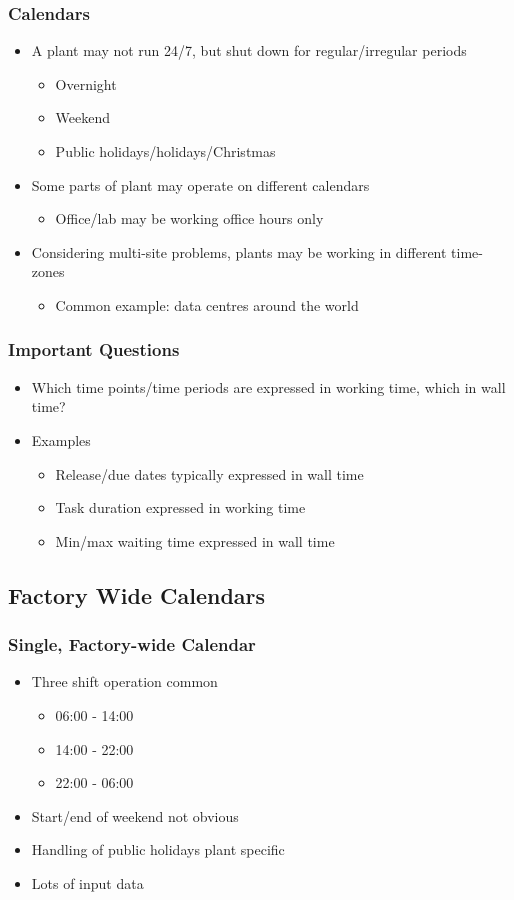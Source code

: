 \begin{frame}
\frametitle{Calendars}
\begin{itemize}
\item A plant may not run 24/7, but shut down for regular/irregular periods
\begin{itemize}
\item Overnight
\item Weekend
\item Public holidays/holidays/Christmas
\end{itemize}
\item Some parts of plant may operate on different calendars
\begin{itemize}
\item Office/lab may be working office hours only
\end{itemize}
\item Considering multi-site problems, plants may be working in different time-zones
\begin{itemize}
\item Common example: data centres around the world
\end{itemize}
\end{itemize}
\end{frame}

\begin{frame}
\frametitle{Important Questions}
\begin{itemize}
\item Which time points/time periods are expressed in working time, which in wall time?
\item Examples
\begin{itemize}
\item Release/due dates typically expressed in wall time
\item Task duration expressed in working time
\item Min/max waiting time expressed in wall time
\end{itemize}

\end{itemize}
\end{frame}

\subsection{Factory Wide Calendars}

\begin{frame}
\frametitle{Single, Factory-wide Calendar}
\begin{itemize}
\item Three shift operation common
\begin{itemize}
\item 06:00 - 14:00
\item 14:00 - 22:00
\item 22:00 - 06:00
\end{itemize}
\item Start/end of weekend not obvious
\item Handling of public holidays plant specific
\item Lots of input data 
\end{itemize}
\end{frame}

